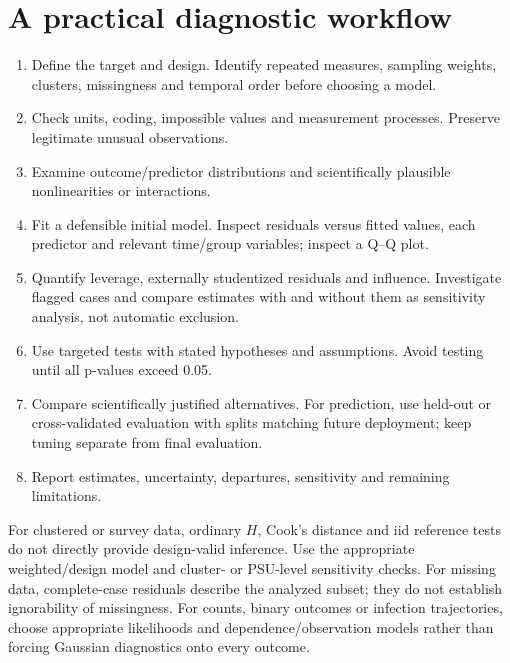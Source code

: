 \documentclass[11pt]{article}
\begin{document}
\section{A practical diagnostic workflow}
\begin{enumerate}
\item Define the target and design. Identify repeated measures, sampling weights, clusters, missingness and temporal order before choosing a model.
\item Check units, coding, impossible values and measurement processes. Preserve legitimate unusual observations.
\item Examine outcome/predictor distributions and scientifically plausible nonlinearities or interactions.
\item Fit a defensible initial model. Inspect residuals versus fitted values, each predictor and relevant time/group variables; inspect a Q--Q plot.
\item Quantify leverage, externally studentized residuals and influence. Investigate flagged cases and compare estimates with and without them as sensitivity analysis, not automatic exclusion.
\item Use targeted tests with stated hypotheses and assumptions. Avoid testing until all p-values exceed 0.05.
\item Compare scientifically justified alternatives. For prediction, use held-out or cross-validated evaluation with splits matching future deployment; keep tuning separate from final evaluation.
\item Report estimates, uncertainty, departures, sensitivity and remaining limitations.
\end{enumerate}
For clustered or survey data, ordinary $H$, Cook's distance and iid reference tests do not directly provide design-valid inference. Use the appropriate weighted/design model and cluster- or PSU-level sensitivity checks. For missing data, complete-case residuals describe the analyzed subset; they do not establish ignorability of missingness. For counts, binary outcomes or infection trajectories, choose appropriate likelihoods and dependence/observation models rather than forcing Gaussian diagnostics onto every outcome.
\end{document}
